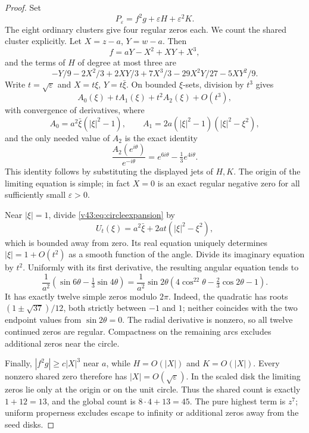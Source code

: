 \documentclass[UTF8,11pt]{ctexart}
\theoremstyle{definition}
\numberwithin{equation}{section}
\begin{document}
\begin{proof}
Set
\[
                       P_\varepsilon=f^2g+\varepsilon H+\varepsilon^2K.
\]
The eight ordinary clusters give four regular zeros each.
We count the shared cluster explicitly. Let $X=z-a$, $Y=w-a$.
Then
\[
 f=aY-X^2+XY+X^3,
\]
and the terms of $H$ of degree at most three are
\[
 -Y/9-2X^2/3+2XY/3+7X^3/3-29X^2Y/27-5XY^2/9.
\]
Write $t=\sqrt\varepsilon$ and $X=t\xi$, $Y=t\bar\xi$.
On bounded $\xi$-sets, division by $t^3$ gives
\begin{equation}\label{v43:eq:circleexpansion}
 A_0(\xi)+tA_1(\xi)+t^2A_2(\xi)+O(t^3),
\end{equation}
with convergence of derivatives, where
\[
 A_0=a^2\bar\xi(|\xi|^2-1),\qquad
 A_1=2a(|\xi|^2-1)(|\xi|^2-\xi^2),
\]
and the only needed value of $A_2$ is the exact identity
\begin{equation}\label{v43:eq:angularidentity}
        \frac{A_2(e^{i\theta})}{e^{-i\theta}}
                           =e^{6i\theta}-\tfrac13e^{4i\theta}.
\end{equation}
This identity follows by substituting the displayed jets of $H,K$.
The origin of the limiting equation is simple; in fact $X=0$
is an exact regular negative zero for all sufficiently small
$\varepsilon>0$.

Near $|\xi|=1$, divide \eqref{v43:eq:circleexpansion} by
\[
 U_t(\xi)=a^2\bar\xi+2at(|\xi|^2-\xi^2),
\]
which is bounded away from zero. Its real equation uniquely
determines $|\xi|=1+O(t^2)$ as a smooth function of the angle.
Divide its imaginary equation by $t^2$. Uniformly with its
first derivative, the resulting angular equation tends to
\[
 \frac1{a^2}\left(\sin6\theta-\tfrac13\sin4\theta\right)
 =\frac1{a^2}\sin2\theta
     \left(4\cos^22\theta-\tfrac23\cos2\theta-1\right).
\]
It has exactly twelve simple zeros modulo $2\pi$.
Indeed, the quadratic has roots $(1\pm\sqrt{37})/12$,
both strictly between $-1$ and $1$; neither coincides with
the two endpoint values from $\sin2\theta=0$.
The radial derivative is nonzero, so all twelve continued
zeros are regular. Compactness on the remaining arcs excludes
additional zeros near the circle.

Finally, $|f^2g|\ge c|X|^3$ near $a$, while $H=O(|X|)$
and $K=O(|X|)$. Every nonzero shared zero therefore has
$|X|=O(\sqrt\varepsilon)$. In the scaled disk the limiting
zeros lie only at the origin or on the unit circle. Thus the
shared count is exactly $1+12=13$, and the global count is
$8\cdot4+13=45$. The pure highest term is $z^7$; uniform
properness excludes escape to infinity or additional zeros
away from the seed disks.


\end{proof}
\end{document}
